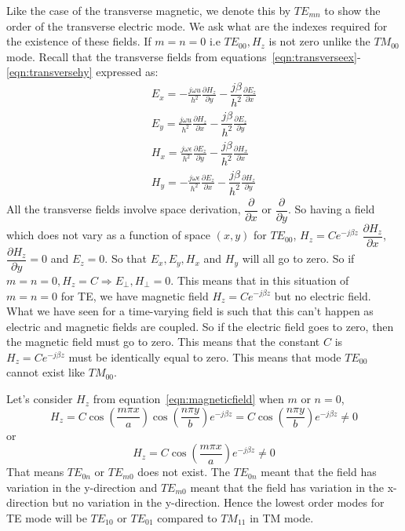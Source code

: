Like the case of the transverse magnetic, we denote this by $TE_{mn}$ to show the order of the transverse electric mode. We ask what are the indexes required for the existence of these fields. If $m = n = 0$ i.e $TE_{00},H_z$ is not zero unlike the $TM_{00}$ mode. Recall that the transverse fields from equations~\ref{eqn:transverseex}-\ref{eqn:transversehy} expressed as:
\begin{align*}
E_x = -\frac{j\omega u}{h^2}\frac{\partial H_z}{\partial y} - \dfrac{j\beta}{h^2}\frac{\partial E_z}{\partial x}\\
E_y = \frac{j\omega u}{h^2}\frac{\partial H_z}{\partial x} - \dfrac{j\beta}{h^2}\frac{\partial E_z}{\partial y}\\
H_x = \frac{j\omega \epsilon}{h^2}\frac{\partial E_z}{\partial y} - \dfrac{j\beta}{h^2}\frac{\partial H_x}{\partial x}\\
H_y = -\frac{j\omega \epsilon}{h^2}\frac{\partial E_z}{\partial x} - \dfrac{j\beta}{h^2}\frac{\partial H_z}{\partial y}
\end{align*}
All the transverse fields involve space derivation, $\dfrac{\partial}{\partial x}$ or $\dfrac{\partial}{\partial y}$. So having a field which does not vary as a function of space $(x,y)$ for $TE_{00}$, $H_z = Ce^{-j\beta z}$  $\dfrac{\partial H_z}{\partial x}$,  $\dfrac{\partial H_z}{\partial y} = 0$ and $E_z = 0$. So that $E_x, E_y, H_x$ and $H_y$ will all go to zero. So if $m = n = 0, H_z = C \Rightarrow E_\bot , H_\bot = 0$. This means that in this situation of $m = n = 0$ for TE, we have magnetic field $H_z = Ce^{-j\beta z}$ but no electric field. What we have seen for a time-varying field is such that this can't happen as electric and magnetic fields are coupled. So if the electric field goes to zero, then the magnetic field must go to zero. This means that the constant $C$ is $H_z = Ce^{-j\beta z}$ must be identically equal to zero. This means that mode $TE_{00}$ cannot exist like $TM_{00}$.

Let's consider $H_z$ from equation~\ref{eqn:magneticfield} when $m$ or $n = 0$,
\begin{dmath*}
H_z = C \cos \left(\frac{m\pi x}{a}\right)\cos\left(\frac{n\pi y}{b}\right)e^{-j\beta z} = C \cos \left(\frac{n\pi y}{b}\right)e^{-j\beta z} \neq 0 
\end{dmath*}
or 
\begin{dmath*}
H_z = C \cos \left(\frac{m\pi x}{a}\right)e^{-j\beta z} \neq 0 
\end{dmath*}
That means $TE_{0n}$ or $TE_{m0}$ does not exist. The $TE_{0n}$ meant that the field has variation in the y-direction and $TE_{m0}$ meant that the field has variation in the x-direction but no variation in the y-direction. Hence the lowest order modes for TE mode will be $TE_{10}$ or $TE_{01}$ compared to $TM_{11}$ in TM mode. 

